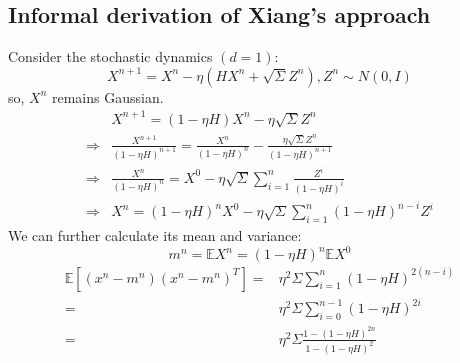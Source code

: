 \subsection{Informal derivation of Xiang's approach}
Consider the stochastic dynamics $(d=1)$:
$$
X^{n+1}=X^n-\eta\left( HX^n+\sqrt{\Sigma}Z^{n} \right) ,Z^{n}\sim N(0,I)
$$
so, $X^n$ remains Gaussian.
\begin{equation*}
    \begin{aligned}
        &X^{n+1}=\left(1-\eta H\right) X^n-\eta \sqrt{\Sigma}Z^{n} \\
        \Rightarrow& \frac{X^{n+1}}{\left(1-\eta H\right)^{n+1}} = \frac{X^{n}}{\left(1-\eta H\right)^{n}}-\frac{\eta \sqrt{\Sigma}Z^{n}}{\left(1-\eta H\right)^{n+1}}\\
        \Rightarrow& \frac{X^{n}}{\left(1-\eta H\right)^{n}} =X^0 - \eta\sqrt{\Sigma}\sum_{i = 1}^{n}\frac{Z^i}{\left(1-\eta H\right)^{i}} \\
        \Rightarrow& X^{n} =\left(1-\eta H\right)^{n}X^0 -\eta\sqrt{\Sigma}\sum_{i = 1}^{n}\left(1-\eta H\right)^{n-i}Z^i
    \end{aligned}
\end{equation*}
We can further calculate its mean and variance:
$$
m^n = \mathbb{E} X^n = (1-\eta H)^n \mathbb{E} X^0
$$
\begin{equation*}
    \begin{aligned}
        \mathbb{E}\left[ (x^n-m^n)(x^n-m^n)^T \right] =& \eta^2\Sigma  \sum_{i = 1}^{n}(1-\eta H)^{2(n-i)}\\
        =&\eta^2\Sigma \sum_{i = 0}^{n-1}(1-\eta H)^{2i}\\
        =&\eta^2\Sigma\frac{1-(1-\eta H)^{2n}}{1-(1-\eta H)^2}
    \end{aligned}
\end{equation*}




